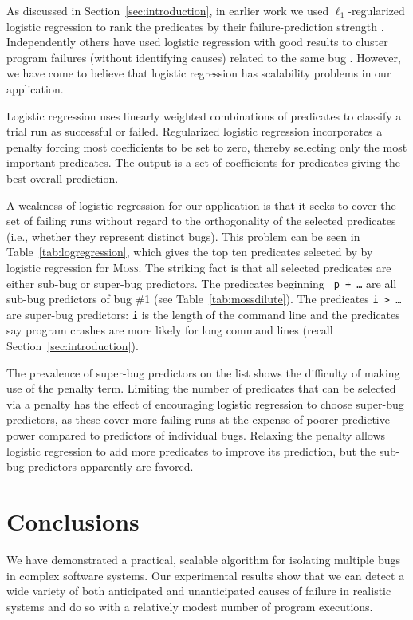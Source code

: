 \documentclass[draft]{sig-alternate}
\newcommand{\moss}{\textsc{Moss}\xspace}
\begin{document}
As discussed in Section~\ref{sec:introduction}, in earlier work 
we used $\ell_1$-regularized logistic regression
to rank the predicates by their
failure-prediction strength \cite{PLDI`03*141,Zheng:2003:SDSP}.  Independently others have used
logistic regression with good results to cluster program failures (without
identifying causes) related to the same bug \cite{ICSE`03*465}.  However, we have come
to believe that logistic regression has scalability problems in our application.

Logistic regression uses linearly weighted
combinations of predicates to classify a trial run as successful or
failed.  Regularized logistic regression incorporates a penalty
forcing most coefficients to be set to zero, thereby
selecting only the most important predicates.  The output is a set of
coefficients for predicates giving the best overall prediction.

A weakness of logistic regression for our application is that it seeks
to cover the set of failing runs without regard to the orthogonality
of the selected predicates (i.e., whether they represent distinct
bugs).  This problem can be seen in Table~\ref{tab:logregression},
which gives the top ten predicates selected by by logistic regression
for \moss.  The striking fact is that all selected predicates are
either sub-bug or super-bug predictors.  The predicates beginning {\tt
p + \ldots} are all sub-bug predictors of bug \#1 (see
Table~\ref{tab:mossdilute}).  The predicates {\tt i > \ldots} are
super-bug predictors: {\tt i} is the length of the command line and
the predicates say program crashes are more likely for long command
lines (recall Section~\ref{sec:introduction}).

The prevalence of super-bug predictors on the list shows the
difficulty of making use of the penalty term.  Limiting the number of
predicates that can be selected via a penalty has the effect of
encouraging logistic regression to choose super-bug predictors, as
these cover more failing runs at the expense of poorer predictive
power compared to predictors of individual bugs.  Relaxing the penalty
allows logistic regression to add more predicates to improve its
prediction, but the sub-bug predictors apparently are favored.

\section{Conclusions}
\label{sec:conclusions}

We have demonstrated a practical, scalable algorithm for isolating multiple bugs
in complex software systems.  Our experimental results show that we can
detect a wide variety of both anticipated and unanticipated causes of failure
in realistic systems and do so with a relatively modest number of program
executions.

{\small

}
\end{document}

